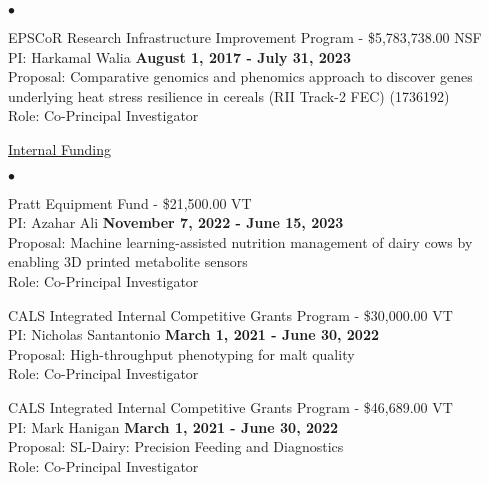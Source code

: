 \documentclass[margin,line,10pt]{res}
\newenvironment{list2}{
  \begin{list}{$\bullet$}{%
      \setlength{\itemsep}{0in}
      \setlength{\parsep}{0in} \setlength{\parskip}{0in}
      \setlength{\topsep}{0in} \setlength{\partopsep}{0in} 
      \setlength{\leftmargin}{0.2in}}}{\end{list}}
\begin{document}
\begin{resume}
\begin{list2}
\vspace{0.5cm}
  
\item EPSCoR Research Infrastructure Improvement Program - \$5,783,738.00   \hfill NSF  \\
PI: Harkamal Walia   \hfill \textbf{August 1, 2017 - July 31, 2023}\\
Proposal:  Comparative genomics and phenomics approach to discover genes underlying heat stress resilience in cereals  (RII Track-2 FEC)  (1736192) \\
Role: Co-Principal Investigator \\

\end{list2}




\begin{flushleft}
\hspace{0.2cm} \underline{Internal Funding}
\end{flushleft}
\begin{list2}


  \item Pratt Equipment Fund - \$21,500.00  \hfill VT\\
  PI: Azahar Ali \hfill \textbf{November 7, 2022 - June 15, 2023}\\
  Proposal: Machine learning-assisted nutrition management of dairy cows by enabling 3D printed metabolite sensors\\
  Role: Co-Principal Investigator \\
  
  \vspace{0.5cm}

  \item CALS Integrated Internal Competitive Grants Program  - \$30,000.00  \hfill VT\\
PI: Nicholas Santantonio \hfill \textbf{March 1, 2021 - June 30, 2022}\\
Proposal: High-throughput phenotyping for malt quality\\
Role: Co-Principal Investigator \\

\vspace{0.5cm}


 \item CALS Integrated Internal Competitive Grants Program  - \$46,689.00  \hfill VT\\
PI: Mark Hanigan \hfill \textbf{March 1, 2021 - June 30, 2022}\\
Proposal: SL-Dairy: Precision Feeding and Diagnostics\\
Role: Co-Principal Investigator \\



\end{list2}
\end{resume}
\end{document}

